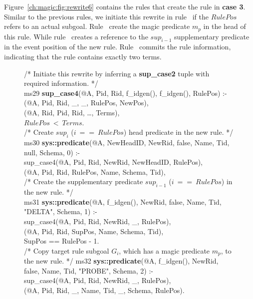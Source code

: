 Figure~\ref{ch:magic:fig:rewrite6} contains the rules that create the rule
in {\bf case 3}. Similar to the previous rules, we initiate this rewrite in
rule~ if the $RulePos$ refers to an actual subgoal. Rule~
create the magic predicate $m_p$ in the head of this rule. While rule~
creates a reference to the $sup_{i-1}$ supplementary predicate in the
event position of the new rule. Rule~ commits the rule information,
indicating that the rule contains exactly two terms.

\begin{figure}[!t]
\ssp
\centering
\begin{boxedminipage}{\linewidth}
/* Initiate this rewrite by inferring a {\bf sup\_case2} tuple with required information. */ \\
ms29 {\bf sup\_case4}(@A, Pid, Rid, f\_idgen(), f\_idgen(), RulePos) :- \\
(@A, Pid, Rid, \_, \_, RulePos, NewPos), \\
(@A, Rid, Pid, Rid, \ldots, Terms), \\
\datalogspace $RulePos\ <\ Terms$. \\
	
/* Create $sup_i$ ($i\ ==\ RulePos$) head predicate in the new rule. */ \\
ms30 {\bf sys::predicate}(@A, NewHeadID, NewRid, false, Name, Tid, null, Schema, 0) :- \\
\datalogspace sup\_case4(@A, Pid, Rid, NewRid, NewHeadID, RulePos), \\
(@A, Pid, Rid, RulePos, Name, Schema, Tid), \\
	
/* Create the supplementary predicate $sup_{i-1}$ ($i\ ==\ RulePos$) in the new rule. */ \\
ms31 {\bf sys::predicate}(@A, f\_idgen(), NewRid, false, Name, Tid, "DELTA", Schema, 1) :- \\
\datalogspace sup\_case4(@A, Pid, Rid, NewRid, \_, RulePos), \\
(@A, Pid, Rid, SupPos, Name, Schema, Tid), \\
\datalogspace SupPos == RulePos - 1. \\

/* Copy target rule subgoal $G_i$, which has a magic predicate $m_p$, to the new rule. */
ms32 {\bf sys::predicate}(@A, f\_idgen(), NewRid, false, Name, Tid, "PROBE", Schema, 2) :- \\
\datalogspace sup\_case4(@A, Pid, Rid, NewRid, \_, RulePos), \\
(@A, Pid, Rid, \_, Name, Tid, \_, Schema, RulePos). \\
	

\end{boxedminipage}
\end{figure}
